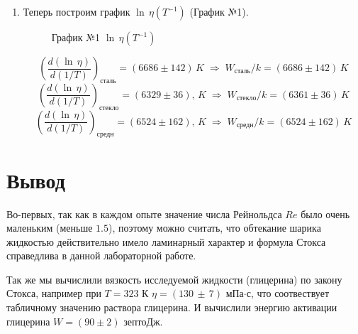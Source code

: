 \documentclass[a4paper,12pt]{article}
\begin{document}
\begin{enumerate}
	\item Теперь построим график $\ln \, \eta (T^{-1})$ (График №1).
	\begin{figure}[h!]
		\caption[]{\label{fig:3} График №1 $\ln \, \eta (T^{-1})$}
	\end{figure}
	$$\left(\dfrac{d(\ln\, \eta)}{d(1/T)}\right)_{сталь} = (6686 \pm 142)\, K \; \Rightarrow \; W_{сталь}/k = (6686 \pm 142)\, K$$
	$$\left(\dfrac{d(\ln\, \eta)}{d(1/T)}\right)_{стекло} = (6329 \pm 36),\, K \; \Rightarrow \; W_{стекло}/k = (6361 \pm 36)\, K$$
	$$\left(\dfrac{d(\ln\, \eta)}{d(1/T)}\right)_{средн} = (6524 \pm 162),\, K \; \Rightarrow \; W_{средн}/k = (6524 \pm 162)\, K$$

\end{enumerate}

\newpage 

\section{Вывод}
	Во-первых, так как в каждом опыте значение числа Рейнольдса $Re$ было очень маленьким (меньше $1.5$), поэтому можно считать, что обтекание шарика жидкостью действительно имело ламинарный характер и формула Стокса справедлива в данной лабораторной работе. 

	Так же мы вычислили вязкость исследуемой жидкости (глицерина) по закону Стокса, например при $T = 323$ К $\eta = (130\, \pm \, 7)$ мПа$\cdot$с, что соотвествует табличному значению раствора глицерина.
	И вычислили энергию активации глицерина $W =(90 \pm 2)$ зептоДж.
\end{document}
